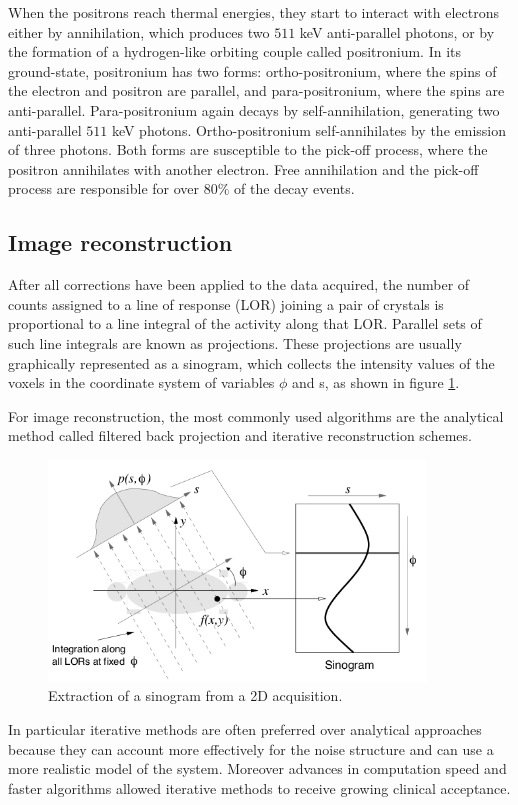 When the positrons reach thermal energies, they start to interact with electrons either by annihilation, which produces two $511$ keV anti-parallel photons, or by the formation of a hydrogen-like orbiting couple called positronium. In its ground-state, positronium has two forms: ortho-positronium, where the spins of the electron and positron are parallel, and para-positronium, where the spins are anti-parallel. Para-positronium again decays by self-annihilation, generating two anti-parallel $511$ keV photons. Ortho-positronium self-annihilates by the emission of three photons. Both forms are susceptible to the pick-off process, where the positron annihilates with another electron. Free annihilation and the pick-off process are responsible for over $80\%$ of the decay events.

\subsection{Image reconstruction}

After all corrections have been applied to the data acquired, the number of counts assigned to a line of response (LOR) joining a pair of crystals is proportional to a line integral of the activity along that LOR. Parallel sets of such line integrals are known as projections.
These projections are usually graphically represented as a sinogram, which collects the intensity values of the voxels in the coordinate system of variables $\phi$ and s, as shown in figure \ref{fig:reco}.

For image reconstruction, the most commonly used algorithms are the analytical method called filtered back projection and iterative reconstruction schemes.
\begin{figure} 
\centering 
\includegraphics[width=10cm]{Pictures/Chapter_1/proj_sin.jpg}
\caption[Image reconstruction in PET]{Extraction of a sinogram from a 2D acquisition.}
\label{fig:reco}
\end{figure}
In particular iterative methods are often preferred over analytical approaches because they can account more effectively for the noise structure and can use a more realistic model of the system. Moreover advances in computation speed and faster algorithms allowed iterative methods to receive growing clinical acceptance.

